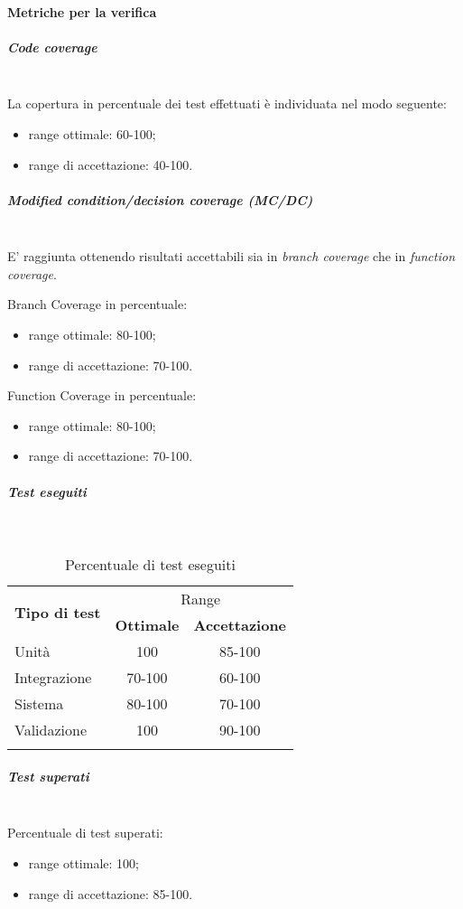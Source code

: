 \paragraph{Metriche per la verifica}\mbox{}
\subparagraph{Code coverage}\mbox{}\\
La copertura in percentuale dei test effettuati è individuata nel modo seguente:
\begin{itemize}
	\item range ottimale: 60-100;
	\item range di accettazione: 40-100.
\end{itemize}

\subparagraph{Modified condition/decision coverage (MC/DC)}\mbox{}\\
E' raggiunta ottenendo risultati accettabili sia in \textit{branch coverage} che in \textit{function coverage}.

Branch Coverage in percentuale:
\begin{itemize}
	\item range ottimale: 80-100;
	\item range di accettazione: 70-100.
\end{itemize}

Function Coverage in percentuale:
\begin{itemize}
	\item range ottimale: 80-100;
	\item range di accettazione: 70-100.
\end{itemize}

\subparagraph{Test eseguiti}\mbox{}\\
\begin{longtable}[h]{|l|c|c|}
	\hline \multirow{2}{*}{\textbf{Tipo di test}} & \multicolumn{2}{c|}{Range} \\ \cline{2-3}
	& \multicolumn{1}{c|}{\textbf{Ottimale}} & \multicolumn{1}{c|}{\textbf{Accettazione}} \\ \hline
	\endfirsthead
	\hline Unità & 100 & 85-100 \\
	\hline Integrazione & 70-100 & 60-100 \\
	\hline Sistema & 80-100 & 70-100 \\
	\hline Validazione & 100 & 90-100 \\
	\hline
	\caption{Percentuale di test eseguiti}
\end{longtable}

\subparagraph{Test superati}\mbox{}\\
Percentuale di test superati:
\begin{itemize}
	\item range ottimale: 100;
	\item range di accettazione: 85-100.
\end{itemize}

